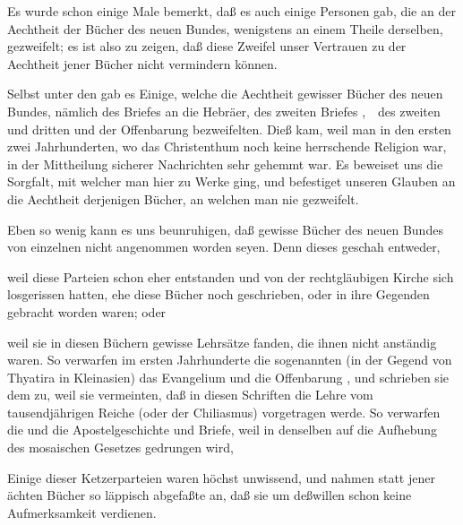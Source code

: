 Es wurde schon einige Male bemerkt, daß es auch einige Personen gab, die an der Aechtheit der Bücher des neuen Bundes, wenigstens an einem Theile derselben, gezweifelt; es ist also zu zeigen, daß diese Zweifel unser Vertrauen zu der Aechtheit jener Bücher nicht vermindern können.
\begin{aufza}
\item Selbst unter den  gab es Einige, welche die Aechtheit gewisser Bücher des neuen Bundes, nämlich des Briefes an die Hebräer, des zweiten Briefes ,~\ des zweiten und dritten  und der Offenbarung bezweifelten. Dieß kam, weil man in den ersten zwei Jahrhunderten, wo das Christenthum noch keine herrschende Religion war, in der Mittheilung sicherer Nachrichten sehr gehemmt war. Es beweiset uns die Sorgfalt, mit welcher man hier zu Werke ging, und befestiget unseren Glauben an die Aechtheit derjenigen Bücher, an welchen man nie gezweifelt.
\item Eben so wenig kann es uns beunruhigen, daß gewisse Bücher des neuen Bundes von einzelnen  nicht angenommen worden seyen. Denn dieses geschah entweder,
\begin{aufzb}
\item weil diese Parteien schon eher entstanden und von der rechtgläubigen Kirche sich losgerissen hatten, ehe diese Bücher noch geschrieben, oder in ihre Gegenden gebracht worden waren; oder
\item weil sie in diesen Büchern gewisse Lehrsätze fanden, die ihnen nicht anständig waren. So verwarfen im ersten Jahrhunderte die sogenannten  (in der Gegend von Thyatira in Kleinasien) das Evangelium und die Offenbarung , und schrieben sie dem  zu, weil sie vermeinten, daß in diesen Schriften die Lehre vom tausendjährigen Reiche (oder der Chiliasmus) vorgetragen werde. So verwarfen die  und  die Apostelgeschichte und  Briefe, weil in denselben auf die Aufhebung des mosaischen Gesetzes gedrungen wird, \usw
\item Einige dieser Ketzerparteien waren höchst unwissend, und nahmen statt jener ächten Bücher so läppisch abgefaßte an, daß sie um deßwillen schon keine Aufmerksamkeit verdienen.

\end{aufzb}
\end{aufza}
